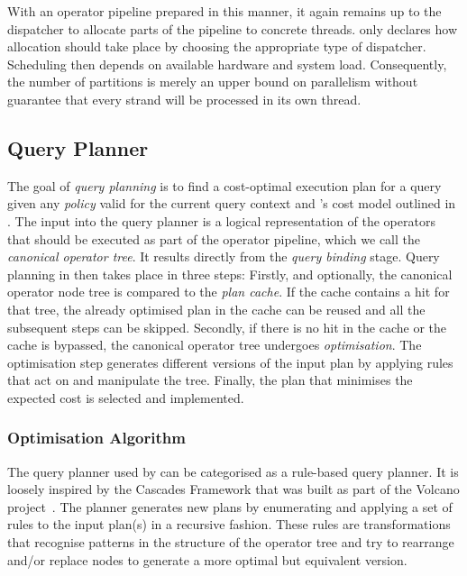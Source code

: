 With an operator pipeline prepared in this manner, it again remains up to the dispatcher to allocate parts of the pipeline to concrete threads. \cottontail{} only declares how allocation should take place by choosing the appropriate type of dispatcher. Scheduling then depends on available hardware and system load. Consequently, the number of partitions is merely an upper bound on parallelism without guarantee that every strand will be processed in its own thread. 

\subsection{Query Planner}
\label{section:cottontail_query_planner}

The goal of \emph{query planning} is to find a cost-optimal execution plan for a query given any \emph{policy} valid for the current query context and \cottontail{}'s cost model outlined in . The input into the query planner is a logical representation of the operators that should be executed as part of the operator pipeline, which we call the \emph{canonical operator tree}. It results directly from the \emph{query binding} stage. Query planning in \cottontail{} then takes place in three steps: Firstly, and optionally, the canonical operator node tree is compared to the \emph{plan cache}. If the cache contains a hit for that tree, the already optimised plan in the cache can be reused and all the subsequent steps can be skipped. Secondly, if there is no hit in the cache or the cache is bypassed, the canonical operator tree undergoes \emph{optimisation}. The optimisation step generates different versions of the input plan by applying rules that act on and manipulate the tree. Finally, the plan that minimises the expected cost is selected and implemented.

\subsubsection{Optimisation Algorithm}

The query planner used by \cottontail{} can be categorised as a rule-based query planner. It is loosely inspired by the Cascades Framework that was built as part of the Volcano project~\cite{Graefe:1993Volcano}. The planner generates new plans by enumerating and applying a set of rules to the input plan(s) in a recursive fashion. These rules are transformations that recognise patterns in the structure of the operator tree and try to rearrange and/or replace nodes to generate a more optimal but equivalent version.

